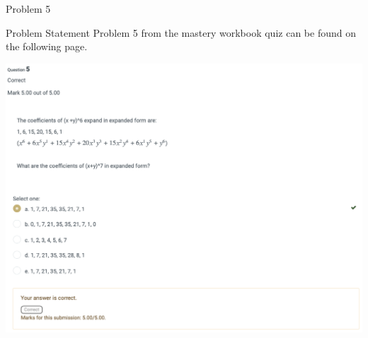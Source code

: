 \begin{problem}{Problem 5}
    \begin{statement}{Problem Statement}
        Problem 5 from the mastery workbook quiz can be found on the following page.
    \end{statement}
    \begin{Highlight}[Solution]
        \begin{center}
            \includegraphics[width = 1.0\textwidth]{Images/Problem 5.png}
        \end{center}
    \end{Highlight}
\end{problem}

